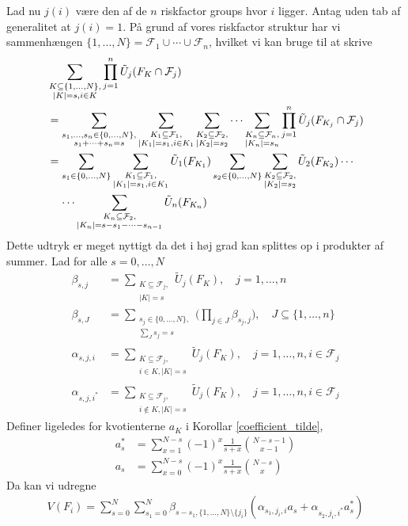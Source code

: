 \documentclass[a4paper, 12pt]{article}
\begin{document}
Lad nu $j(i)$ være den af de $n$ riskfactor groups hvor $i$ ligger. Antag uden tab af generalitet at $j(i)=1$. På grund af vores riskfactor struktur har vi sammenhængen $\{1, \dots, N\}=\mathcal F_1\cup \cdots \cup \mathcal F_n$, hvilket vi kan bruge til at skrive
\begin{align}
 &\sum_{\substack{K\subseteq \{1, \dots, N\},\\ |K|=s, i\in K}}\prod_{j=1}^n \tilde U_j(F_K\cap \mathcal F_j)\\
 &= \sum_{\substack{s_1, \dots, s_n\in \{0,\dots,N\},\\
s_1+\dots+s_n=s}} \sum_{\substack{K_1\subseteq \mathcal F_1, \\ |K_1|=s_1, i\in K_1}}\sum_{\substack{K_2\subseteq \mathcal F_2, \\ |K_2|=s_2}}\cdots \sum_{\substack{K_n\subseteq \mathcal F_n, \\ |K_n|=s_n}} \prod_{j=1}^n \tilde U_j(F_{K_j}\cap \mathcal F_j)\\
&=\begin{lgathered}[t]\sum_{s_1\in \{0, \dots, N\}}\sum_{\substack{K_1\subseteq \mathcal F_1, \\ |K_1|=s_1, i\in K_1}} \tilde U_1(F_{K_1}) \sum_{s_2\in \{0, \dots, N\}}\sum_{\substack{K_2\subseteq \mathcal F_2, \\ |K_2|=s_2}}\tilde U_2(F_{K_2})\cdots \\ \cdots\sum_{\substack{K_n\subseteq \mathcal F_2, \\  |K_n|=s-s_1-\dots-s_{n-1}}}\tilde U_n(F_{K_n})\end{lgathered}
\end{align}
Dette udtryk er meget nyttigt da det i høj grad kan splittes op i produkter af summer. Lad for alle $s=0,\dots, N$
\begin{align}
\beta_{s,j}&=\sum_{\substack{K\subseteq \mathcal F_j,\\ |K|=s}} \tilde U_j(F_K), \quad  j=1, \dots, n\\
\beta_{s,J}&=\sum_{\substack{s_{j} \in \{0, \dots, N\},\\ \sum_{J} s_{j}=s}}\biggl( \prod_{j \in J} \beta_{s_j,j}\biggr), \quad J\subseteq \{1, \dots, n\}\\
\alpha_{s,j,i}&=\sum_{\substack{K\subseteq \mathcal F_j, \\
i\in K, |K|=s}}\tilde U_j(F_K), \quad j=1,\dots, n, i\in\mathcal F_j \\
\alpha_{s,j,i^*}&=\sum_{\substack{K\subseteq \mathcal F_j, \\
i\not\in K, |K|=s}}\tilde U_j(F_K), \quad j=1,\dots, n, i\in\mathcal F_j 
\end{align}
Definer ligeledes for kvotienterne $a_K$ i Korollar \ref{coefficient_tilde},
\begin{align}
a_{s}^*&=\sum_{x=1}^{N-s}(-1)^x\frac{1}{s+x}{N-s-1 \choose x-1} \\
a_s&=\sum_{x=0}^{N-s} (-1)^x \frac{1}{s+x}{N-s\choose x}
\end{align}
Da kan vi udregne 
\begin{align}
V(F_i)=\sum_{s=0}^{N} \sum_{s_1=0}^N \beta_{s-s_1, \{1, \dots, N\}\setminus \{j_i\}}(\alpha_{s_1,j_i,i}a_s+\alpha_{s_2, j_i,i^*}a_s^*)
\end{align}
\end{document}
